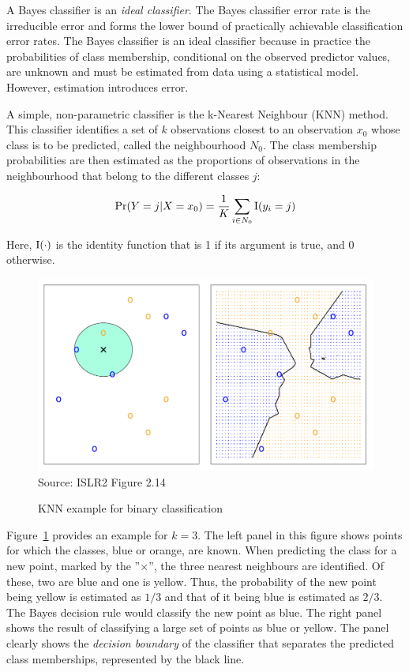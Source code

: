 A Bayes classifier is an \emph{ideal classifier}. The Bayes classifier error rate is the irreducible error and forms the lower bound of practically achievable classification error rates. The Bayes classifier is an ideal classifier because in practice the probabilities of class membership, conditional on the observed predictor values, are unknown and must be estimated from data using a statistical model. However, estimation introduces error.

A simple, non-parametric classifier is the k-Nearest Neighbour (KNN) method. This classifier identifies a set of $k$ observations closest to an observation $x_0$ whose class is to be predicted, called the neighbourhood $N_0$. The class membership probabilities are then estimated as the proportions of observations in the neighbourhood that belong to the different classes $j$:

\begin{align*}
\Pr (Y=j|X=x_0) = \frac{1}{K} \sum_{i \in N_0} \operatorname{I} (y_i=j) 
\end{align*}

\noindent 
Here, $\operatorname{I}(\cdot)$ is the identity function that is 1 if its argument is true, and 0 otherwise.

\begin{figure}
\centering
\includegraphics[width=.75\textwidth]{Figures_Chapters_1-6/Chapter2/2_14.pdf} \\
\vspace{3mm}
\scriptsize Source: ISLR2 Figure 2.14
\caption{KNN example for binary classification}
\label{fig:knn1}
\end{figure}

Figure~\ref{fig:knn1} provides an example for $k=3$. The left panel in this figure shows points for which the classes, blue or orange, are known. When predicting the class for a new point, marked by the ''$\times$'', the three nearest neighbours are identified. Of these, two are blue and one is yellow. Thus, the probability of the new point being yellow is estimated as $1/3$ and that of it being blue is estimated as $2/3$. The Bayes decision rule would classify the new point as blue. The right panel shows the result of classifying a large set of points as blue or yellow. The panel clearly shows the \emph{decision boundary} of the classifier that separates the predicted class memberships, represented by the black line.

